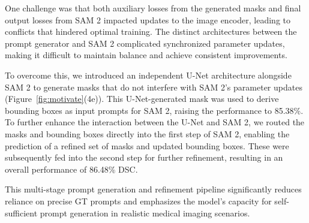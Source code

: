 One challenge was that both auxiliary losses from the generated masks and final output losses from SAM 2 impacted updates to the image encoder, leading to conflicts that hindered optimal training. The distinct architectures between the prompt generator and SAM 2 complicated synchronized parameter updates, making it difficult to maintain balance and achieve consistent improvements.

To overcome this, we introduced an independent U-Net architecture alongside SAM 2 to generate masks that do not interfere with SAM 2’s parameter updates (Figure~\ref{fig:motivate}(4e)). This U-Net-generated mask was used to derive bounding boxes as input prompts for SAM 2, raising the performance to 85.38\%. To further enhance the interaction between the U-Net and SAM 2, we routed the masks and bounding boxes directly into the first step of SAM 2, enabling the prediction of a refined set of masks and updated bounding boxes. These were subsequently fed into the second step for further refinement, resulting in an overall performance of 86.48\% DSC.

This multi-stage prompt generation and refinement pipeline significantly reduces reliance on precise GT prompts and emphasizes the model's capacity for self-sufficient prompt generation in realistic medical imaging scenarios.



















